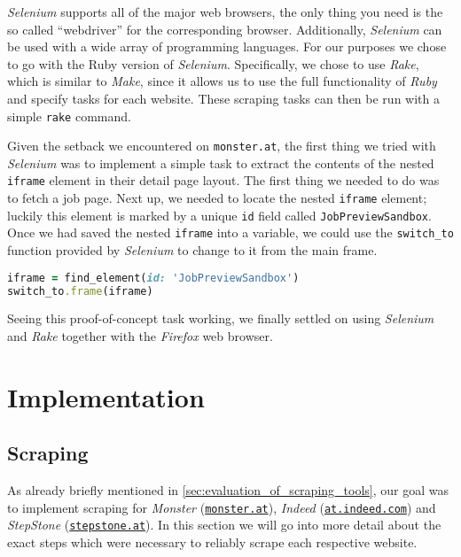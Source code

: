 \documentclass[runningheads]{llncs}
\begin{document}
\textit{Selenium} supports all of the major web browsers, the only thing you need is the so called “webdriver” for the corresponding browser. Additionally, \textit{Selenium} can be used with a wide array of programming languages. For our purposes we chose to go with the Ruby version of \textit{Selenium}. Specifically, we chose to use \textit{Rake}, which is similar to \textit{Make}, since it allows us to use the full functionality of \textit{Ruby} and specify tasks for each website. These scraping tasks can then be run with a simple \texttt{rake} command.

Given the setback we encountered on \texttt{monster.at}, the first thing we tried with \textit{Selenium} was to implement a simple task to extract the contents of the nested \texttt{iframe} element in their detail page layout. The first thing we needed to do was to fetch a job page. Next up, we needed to locate the nested \texttt{iframe} element; luckily this element is marked by a unique \texttt{id} field called \texttt{JobPreviewSandbox}. Once we had saved the nested \texttt{iframe} into a variable, we could use the \texttt{switch\_to} function provided by \textit{Selenium} to change to it from the main frame.

\begin{lstlisting}[language=Ruby]
iframe = find_element(id: 'JobPreviewSandbox')
switch_to.frame(iframe)
\end{lstlisting}

Seeing this proof-of-concept task working, we finally settled on using \textit{Selenium} and \textit{Rake} together with the \textit{Firefox} web browser.

\section{Implementation}

\subsection{Scraping}
\label{sub:scraping}

As already briefly mentioned in \autoref{sec:evaluation_of_scraping_tools}, our goal was to implement scraping for \textit{Monster} (\href{https://www.monster.at/}{\texttt{monster.at}}), \textit{Indeed} (\href{https://at.indeed.com/}{\texttt{at.indeed.com}}) and \textit{StepStone} (\href{https://www.stepstone.at/}{\texttt{stepstone.at}}). In this section we will go into more detail about the exact steps which were necessary to reliably scrape each respective website.
\end{document}
